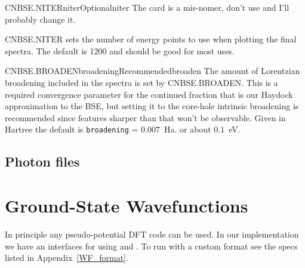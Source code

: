 \documentclass[11pt]{report}
\begin{document}
\begin{Card}{CNBSE.NITER}{niter}{Optional}{niter}
The card is a mis-nomer, don't use and I'll probably change it.

CNBSE.NITER sets the number of energy points to use when plotting the final spectra. The default is 1200 and should be good for most uses.
\end{Card}

\begin{Card}{CNBSE.BROADEN}{broadening}{Recommended}{broaden}
The amount of Lorentzian broadening included in the spectra is set by CNBSE.BROADEN. This is a required convergence parameter for the continued fraction that is our Haydock approximation to the BSE, but setting it to the core-hole intrinsic broadening is recommended since features sharper than that won't be observable. Given in Hartree the default is \texttt{broadening} = $0.007$~Ha. or about $0.1$~eV.
\end{Card}

\section{Photon files}




%

\chapter{Ground-State Wavefunctions}
\label{ground_state}
In principle any pseudo-potential DFT code can be used. In our implementation we have an interfaces for using 
\cite{abinit} and  \cite{quantumespresso}. 
To run with a custom format see the specs listed in Appendix~\ref{WF_format}.
\end{document}
